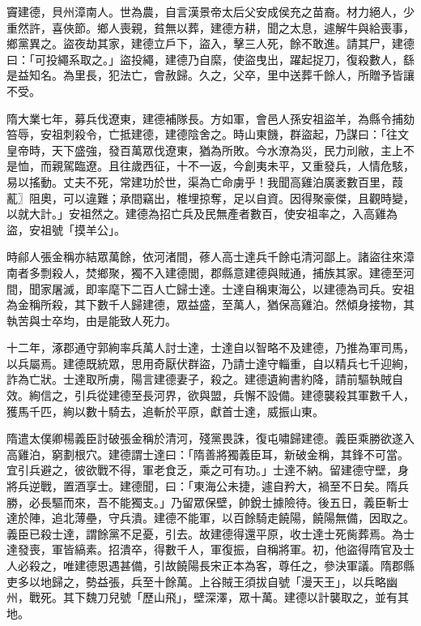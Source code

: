 \begin{pinyinscope}
 竇建德，貝州漳南人。世為農，自言漢景帝太后父安成侯充之苗裔。材力絕人，少重然許，喜俠節。鄉人喪親，貧無以葬，建德方耕，聞之太息，遽解牛與給喪事，鄉黨異之。盜夜劫其家，建德立戶下，盜入，擊三人死，餘不敢進。請其尸，建德曰：「可投繩系取之。」盜投繩，建德乃自縻，使盜曳出，躍起捉刀，復殺數人，繇是益知名。為里長，犯法亡，會赦歸。久之，父卒，里中送葬千餘人，所贈予皆讓不受。



 隋大業七年，募兵伐遼東，建德補隊長。方如軍，會邑人孫安祖盜羊，為縣令捕劾笞辱，安祖刺殺令，亡抵建德，建德陰舍之。時山東饑，群盜起，乃謀曰：「往文皇帝時，天下盛強，發百萬眾伐遼東，猶為所敗。今水潦為災，民力刓敝，主上不是恤，而親駕臨遼。且往歲西征，十不一返，今創夷未平，又重發兵，人情危駭，易以搖動。丈夫不死，常建功於世，渠為亡命虜乎！我聞高雞泊廣袤數百里，葭薍〗阻奧，可以違難；承間竊出，椎埋掠奪，足以自資。因得聚豪傑，且觀時變，以就大計。」安祖然之。建德為招亡兵及民無產者數百，使安祖率之，入高雞為盜，安祖號「摸羊公」。



 時鄃人張金稱亦結眾萬餘，依河渚間，蓚人高士達兵千餘屯清河鄙上。諸盜往來漳南者多剽殺人，焚鄉聚，獨不入建德閭，郡縣意建德與賊通，捕族其家。建德至河間，聞家屠滅，即率麾下二百人亡歸士達。士達自稱東海公，以建德為司兵。安祖為金稱所殺，其下數千人歸建德，眾益盛，至萬人，猶保高雞泊。然傾身接物，其執苦與士卒均，由是能致人死力。



 十二年，涿郡通守郭絢率兵萬人討士達，士達自以智略不及建德，乃推為軍司馬，以兵屬焉。建德既統眾，思用奇厭伏群盜，乃請士達守輜重，自以精兵七千迎絢，詐為亡狀。士達取所虜，陽言建德妻子，殺之。建德遺絢書約降，請前驅執賊自效。絢信之，引兵從建德至長河界，欲與盟，兵懈不設備。建德襲殺其軍數千人，獲馬千匹，絢以數十騎去，追斬於平原，獻首士達，威振山東。



 隋遣太僕卿楊義臣討破張金稱於清河，殘黨畏誅，復屯嘯歸建德。義臣乘勝欲遂入高雞泊，窮劃根穴。建德謂士達曰：「隋善將獨義臣耳，新破金稱，其鋒不可當。宜引兵避之，彼欲戰不得，軍老食乏，乘之可有功。」士達不納。留建德守壁，身將兵逆戰，置酒享士。建德聞，曰：「東海公未捷，遽自矜大，禍至不日矣。隋兵勝，必長驅而來，吾不能獨支。」乃留眾保壁，帥銳士據險待。後五日，義臣斬士達於陣，追北薄壘，守兵潰。建德不能軍，以百餘騎走饒陽，饒陽無備，因取之。義臣已殺士達，謂餘黨不足憂，引去。故建德得還平原，收士達士死胔葬焉。為士達發喪，軍皆縞素。招潰卒，得數千人，軍復振，自稱將軍。初，他盜得隋官及士人必殺之，唯建德恩遇甚備，引故饒陽長宋正本為客，尊任之，參決軍議。隋郡縣吏多以地歸之，勢益張，兵至十餘萬。上谷賊王須拔自號「漫天王」，以兵略幽州，戰死。其下魏刀兒號「歷山飛」，壁深澤，眾十萬。建德以計襲取之，並有其地。




\end{pinyinscope}
